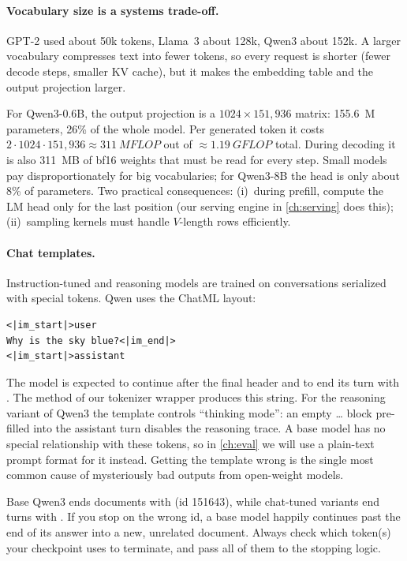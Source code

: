 \paragraph{Vocabulary size is a systems trade-off.} GPT-2 used about 50k tokens, Llama~3 about
128k, Qwen3 about 152k. A larger vocabulary compresses text into fewer tokens, so every request
is shorter (fewer decode steps, smaller KV cache), but it makes the embedding table and the output
projection larger.

\begin{napkinmath}
For Qwen3-0.6B, the output projection is a $1024\times151{,}936$ matrix: \SI{155.6}{M}
parameters, 26\% of the whole model. Per generated token it costs
$2\cdot1024\cdot151{,}936\approx\SI{311}{MFLOP}$ out of $\approx\SI{1.19}{GFLOP}$ total. During
decoding it is also \SI{311}{MB} of bf16 weights that must be read for every step. Small models
pay disproportionately for big vocabularies; for Qwen3-8B the head is only about 8\% of
parameters. Two practical consequences: (i)~during prefill, compute the LM head only for the last
position (our serving engine in \cref{ch:serving} does this); (ii)~sampling kernels must handle
$V$-length rows efficiently.
\end{napkinmath}

\paragraph{Chat templates.} Instruction-tuned and reasoning models are trained on conversations
serialized with special tokens. Qwen uses the ChatML layout:
\begin{lstlisting}[style=plain]
<|im_start|>user
Why is the sky blue?<|im_end|>
<|im_start|>assistant
\end{lstlisting}
The model is expected to continue after the final  header and to end its turn
with . The  method of our tokenizer wrapper produces this string.
For the reasoning variant of Qwen3 the template controls ``thinking mode'': an empty
\ldots{} block pre-filled into the assistant turn disables the reasoning trace.
A base model has no special relationship with these tokens, so in \cref{ch:eval} we will use
a plain-text prompt format for it instead. Getting the template wrong is the single most common
cause of mysteriously bad outputs from open-weight models.

\begin{pitfall}
Base Qwen3 ends documents with  (id 151643), while chat-tuned variants end
turns with . If you stop on the wrong id, a base model happily continues past the
end of its answer into a new, unrelated document. Always check which token(s) your checkpoint
uses to terminate, and pass all of them to the stopping logic.
\end{pitfall}

